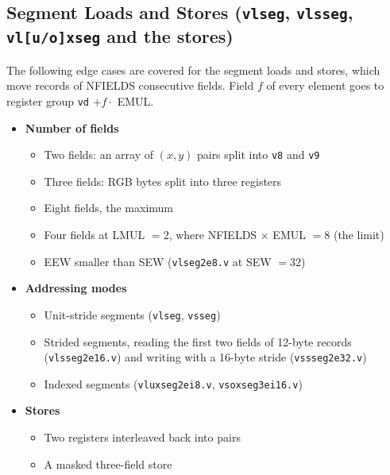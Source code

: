 \documentclass[11pt,a4paper]{article}
\begin{document}
\subsection*{Segment Loads and Stores (\texttt{vlseg}, \texttt{vlsseg}, \texttt{vl[u/o]xseg} and
the stores)}
\label{subsec:ldst-segment}

The following edge cases are covered for the segment loads and stores, which move records of
NFIELDS consecutive fields. Field $f$ of every element goes to register group
\texttt{vd} $+ f \cdot$ EMUL.

\begin{itemize}
    \item \textbf{Number of fields}
    \begin{itemize}
        \item Two fields: an array of $(x, y)$ pairs split into \texttt{v8} and \texttt{v9}
        \item Three fields: RGB bytes split into three registers
        \item Eight fields, the maximum
        \item Four fields at LMUL $= 2$, where NFIELDS $\times$ EMUL $= 8$ (the limit)
        \item EEW smaller than SEW (\texttt{vlseg2e8.v} at SEW $= 32$)
    \end{itemize}

    \item \textbf{Addressing modes}
    \begin{itemize}
        \item Unit-stride segments (\texttt{vlseg}, \texttt{vsseg})
        \item Strided segments, reading the first two fields of 12-byte records
              (\texttt{vlsseg2e16.v}) and writing with a 16-byte stride (\texttt{vssseg2e32.v})
        \item Indexed segments (\texttt{vluxseg2ei8.v}, \texttt{vsoxseg3ei16.v})
    \end{itemize}

    \item \textbf{Stores}
    \begin{itemize}
        \item Two registers interleaved back into pairs
        \item A masked three-field store
    \end{itemize}


\end{itemize}
\end{document}
